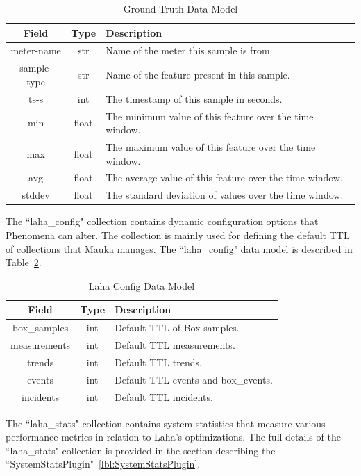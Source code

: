 \begin{table}[H]
	\centering
	\caption{Ground Truth Data Model}
	\begin{tabular}{|c|c|p{8cm}|}
		\hline
		Field & Type & Description \\
		\hline
		meter-name & str & Name of the meter this sample is from. \\
		\hline
		sample-type & str & Name of the feature present in this sample. \\
		\hline
		ts-s & int & The timestamp of this sample in seconds. \\
		\hline
		min & float & The minimum value of this feature over the time window. \\
		\hline
		max & float & The maximum value of this feature over the time window. \\
		\hline
		avg & float & The average value of this feature over the time window. \\
		\hline
		stddev & float & The standard deviation of values over the time window. \\
		\hline
	\end{tabular}
	\label{table:ground_truth}
\end{table}

The ``laha\_config" collection contains dynamic configuration options that Phenomena can alter. The collection is mainly used for defining the default TTL of collections that Mauka manages. The ``laha\_config" data model is described in Table~\ref{table:laha_config}.

\begin{table}[H]
	\centering
	\caption{Laha Config Data Model}
	\begin{tabular}{|c|c|p{8cm}|}
		\hline
		Field & Type & Description \\
		\hline
		box\_samples & int & Default TTL of Box samples. \\
		\hline
		measurements & int & Default TTL measurements. \\
		\hline
		trends & int & Default TTL trends. \\
		\hline
		events & int & Default TTL events and box\_events. \\
		\hline
		incidents & int & Default TTL incidents. \\
		\hline
	\end{tabular}
	\label{table:laha_config}
\end{table}

The ``laha\_stats" collection contains system statistics that measure various performance metrics in relation to Laha's optimizations. The full details of the ``laha\_stats" collection is provided in the section describing the ``SystemStatsPlugin"~\ref{lbl:SystemStatsPlugin}.

